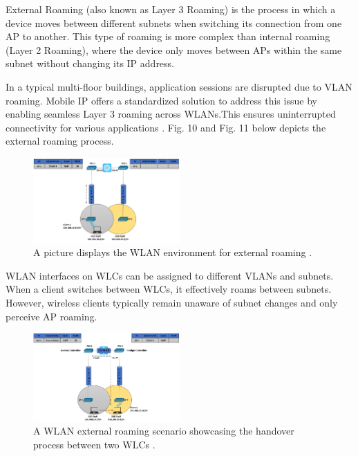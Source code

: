 \documentclass[conference]{IEEEtran}
\begin{document}
External Roaming (also known as Layer 3 Roaming) is the process in which a device moves between different subnets when switching its connection from one AP to another. This type of roaming is more complex than internal roaming (Layer 2 Roaming), where the device only moves between APs within the same subnet without changing its IP address.

In a typical multi-floor buildings, application sessions are disrupted due to VLAN roaming. Mobile IP offers a standardized solution to address this issue by enabling seamless Layer 3 roaming across WLANs.This ensures uninterrupted connectivity for various applications \cite{wlan_fundamentals}. Fig. 10 and Fig. 11 below depicts the external roaming process.

\begin{figure}[htbp]
    \centering
    \includegraphics[width=0.5\textwidth]{fig10_external_roaming.png}
    \caption{A picture displays the WLAN environment for external roaming \cite{study_ccnp}.}
\end{figure}

WLAN interfaces on WLCs can be assigned to different VLANs and subnets. When a client switches between WLCs, it effectively roams between subnets. However, wireless clients typically remain unaware of subnet changes and only perceive AP roaming.

\begin{figure}[htbp]
    \centering
    \includegraphics[width=0.5\textwidth]{fig11_external_roaming_after_roaming.png}
    \caption{A WLAN external roaming scenario showcasing the handover process between two WLCs \cite{study_ccnp}.}
\end{figure}
\end{document}

